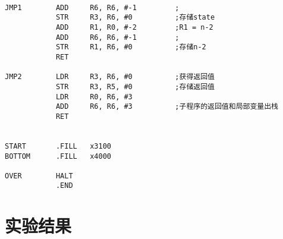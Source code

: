 \documentclass{article}
\begin{document}
\begin{lstlisting}
            
JMP1        ADD     R6, R6, #-1         ;
            STR     R3, R6, #0          ;存储state
            ADD     R1, R0, #-2         ;R1 = n-2
            ADD     R6, R6, #-1         ;
            STR     R1, R6, #0          ;存储n-2
            RET
            
JMP2        LDR     R3, R6, #0          ;获得返回值
            STR     R3, R5, #0          ;存储返回值
            LDR     R0, R6, #3
            ADD     R6, R6, #3          ;子程序的返回值和局部变量出栈
            RET
            
                
START       .FILL   x3100
BOTTOM      .FILL   x4000

OVER        HALT
            .END
\end{lstlisting}


\section{实验结果}
\end{document}
